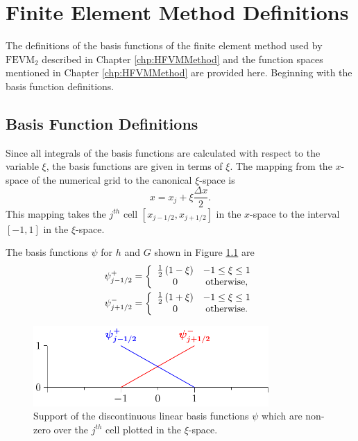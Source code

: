 \chapter{Finite Element Method Definitions}
\label{app:FEMIntegrals}
The definitions of the basis functions of the finite element method used by $\text{FEVM}_2$ described in Chapter \ref{chp:HFVMMethod} and the function spaces mentioned in Chapter \ref{chp:HFVMMethod} are provided here. Beginning with the basis function definitions.

\section{Basis Function Definitions}
Since all integrals of the basis functions are calculated with respect to the variable $\xi$, the basis functions are given in terms of $\xi$. The mapping from the $x$-space of the numerical grid to the canonical $\xi$-space is
\begin{equation*}
x = x_j + \xi \frac{\Delta x}{2}.
\end{equation*}
This mapping takes the $j^{th}$ cell $\left[x_{j-1/2},x_{j+1/2}\right]$ in the $x$-space to the interval $\left[-1,1\right]$ in the $\xi$-space.

The basis functions $\psi$ for $h$ and $G$ shown in Figure \ref{fig:P1DiscBasisAPP} are
\begin{subequations}
	\label{eqn:App1:PsiDef}
\begin{align}
\psi^+_{j-1/2} &= \left\lbrace \begin{array}{c c}
\frac{1}{2}\left(1 - \xi\right) & -1 \le \xi \le 1\\
0 & \text{otherwise} ,
\end{array} \right.  \\
\psi^-_{j+1/2} &= \left\lbrace \begin{array}{c c}
\frac{1}{2}\left(1 + \xi\right) & -1 \le \xi \le 1\\
0 & \text{otherwise} .
\end{array} \right. 
\end{align}
\end{subequations}

\begin{figure}
	\centering
	\includegraphics[width=0.8\textwidth]{./app1/Figures/P1.pdf}
	\caption{Support of the discontinuous linear basis functions $\psi$ which are non-zero over the $j^{th}$ cell plotted in the $\xi$-space.}
	\label{fig:P1DiscBasisAPP}
\end{figure}

